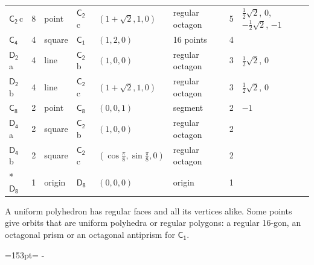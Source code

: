 \documentclass[10pt,a4paper]{article}
\newcommand{\needspace}[1]{\par\penalty-100\begingroup\dimen0=#1\relax\dimen2=\pagegoal
  \advance\dimen2-\pagetotal\ifdim\dimen0>\dimen2\relax\ifdim\dimen2>0pt\vfil\break\fi\fi
  \endgroup}
\numberwithin{equation}{section}
\newcommand{\grp}[1]{\mathsf{#1}}
\newcommand{\clsletter}[1]{\,{\scriptsize\color{black!55}#1}}
\newlength{\fillwidth}\newlength{\cellwidth}\newlength{\colwidth}
\begin{document}
{{\begin{longtable}{@{}lrllllr>{\RaggedRight\arraybackslash}p{\fillwidth}r@{}}
\href{C2.pdf}{$\grp{C_{2}}$}\clsletter{c} & 8 & point & \href{C2.pdf}{$\grp{C_{2}}$}\clsletter{c} & $(1 + \sqrt{2}, 1, 0)$ & regular octagon & 5 & ${\tfrac{1}{2}\sqrt{2}}$, ${0}$, ${-\tfrac{1}{2}\sqrt{2}}$, ${-1}$ & \\
\href{C4.pdf}{$\grp{C_{4}}$} & 4 & square & \href{C1.pdf}{$\grp{C_{1}}$} & $(1, 2, 0)$ & 16 points & 4 &  & \\
\href{D2.pdf}{$\grp{D_{2}}$}\clsletter{a} & 4 & line & \href{C2.pdf}{$\grp{C_{2}}$}\clsletter{b} & $(1, 0, 0)$ & regular octagon & 3 & ${\tfrac{1}{2}\sqrt{2}}$, ${0}$ & \\
\href{D2.pdf}{$\grp{D_{2}}$}\clsletter{b} & 4 & line & \href{C2.pdf}{$\grp{C_{2}}$}\clsletter{c} & $(1 + \sqrt{2}, 1, 0)$ & regular octagon & 3 & ${\tfrac{1}{2}\sqrt{2}}$, ${0}$ & \\
\href{C8.pdf}{$\grp{C_{8}}$} & 2 & point & \href{C8.pdf}{$\grp{C_{8}}$} & $(0, 0, 1)$ & segment & 2 & ${-1}$ & \\
\href{D4.pdf}{$\grp{D_{4}}$}\clsletter{a} & 2 & square & \href{C2.pdf}{$\grp{C_{2}}$}\clsletter{b} & $(1, 0, 0)$ & regular octagon & 2 &  & \\
\href{D4.pdf}{$\grp{D_{4}}$}\clsletter{b} & 2 & square & \href{C2.pdf}{$\grp{C_{2}}$}\clsletter{c} & $(\cos\tfrac{\pi}{8}, \sin\tfrac{\pi}{8}, 0)$ & regular octagon & 2 &  & \\*
\href{D8.pdf}{$\grp{D_{8}}$} & 1 & origin & \href{D8.pdf}{$\grp{D_{8}}$} & $(0, 0, 0)$ & origin & 1 &  & \\
\bottomrule\end{longtable}}}
A uniform polyhedron has regular faces and all its vertices alike. Some points give orbits that are uniform polyhedra or regular polygons: a regular 16-gon, an octagonal prism or an octagonal antiprism for \href{C1.pdf}{$\grp{C_{1}}$}.
\needspace{153pt}
\end{document}
